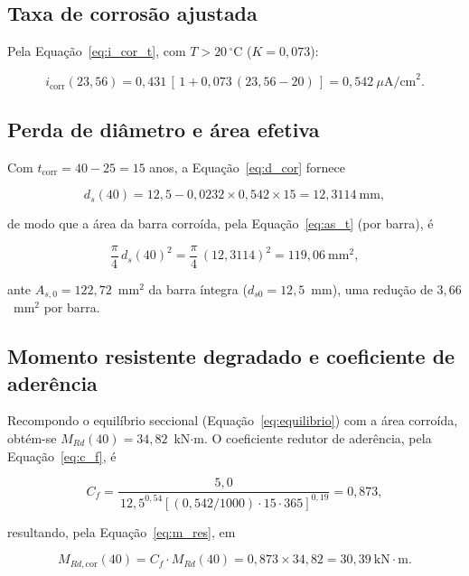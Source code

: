 \begin{appendices}
\subsection{Taxa de corros\~ao ajustada}

Pela Equação~\eqref{eq:i_cor_t}, com $T > 20\,^\circ$C ($K = 0{,}073$):

\begin{equation}
i_{\mathrm{corr}}(23{,}56) = 0{,}431\,\left[\,1 + 0{,}073\,(23{,}56 - 20)\,\right] = 0{,}542~\mu\text{A/cm}^2.
\end{equation}

\subsection{Perda de di\^ametro e \'area efetiva}

Com $t_{\mathrm{corr}} = 40 - 25 = 15$ anos, a Equação~\eqref{eq:d_cor} fornece

\begin{equation}
d_{s}(40) = 12{,}5 - 0{,}0232 \times 0{,}542 \times 15 = 12{,}3114~\text{mm},
\end{equation}

de modo que a área da barra corroída, pela Equação~\eqref{eq:as_t} (por barra), é

\begin{equation}
\frac{\pi}{4}\,d_s(40)^2 = \frac{\pi}{4}\,(12{,}3114)^2 = 119{,}06~\text{mm}^2,
\end{equation}

ante $A_{s,0} = 122{,}72$~mm$^2$ da barra íntegra ($d_{s0} = 12{,}5$~mm), uma redução de $3{,}66$~mm$^2$ por barra.

\subsection{Momento resistente degradado e coeficiente de ader\^encia}

Recompondo o equilíbrio seccional (Equação~\ref{eq:equilibrio}) com a área corroída, obtém-se $M_{Rd}(40) = 34{,}82$~kN$\cdot$m. O coeficiente redutor de aderência, pela Equação~\eqref{eq:c_f}, é

\begin{equation}
C_f = \frac{5{,}0}{\,12{,}5^{0{,}54}\left[(0{,}542/1000)\cdot 15 \cdot 365\right]^{0{,}19}} = 0{,}873,
\end{equation}

resultando, pela Equação~\eqref{eq:m_res}, em

\begin{equation}
M_{Rd,\mathrm{cor}}(40) = C_f \cdot M_{Rd}(40) = 0{,}873 \times 34{,}82 = 30{,}39~\text{kN}\cdot\text{m}.
\end{equation}


\end{appendices}
